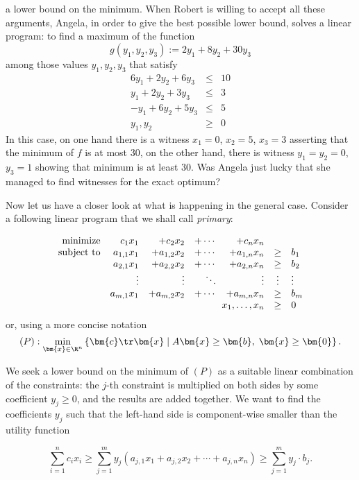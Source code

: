 a lower bound on the minimum. When Robert is willing to accept all these arguments, Angela, in order to give
the best possible lower bound, solves a linear program: to find a maximum of the function 
$$g(y_1,y_2,y_3):=2 y_1+8 y_2+30 y_3$$
among those values  $y_1, y_2, y_3$ that satisfy
\begin{eqnarray*}
6y_1 + 2y_2 + 6y_3 &\le& 10\\
y_1 + 2y_2 + 3y_3 &\le& 3\\
-y_1 + 6y_2 + 5y_3 &\le& 5\\
y_1,y_2 &\ge& 0
\end{eqnarray*}
In this case, on one hand there is a witness $x_1=0$, $x_2=5$, $x_3=3$ asserting that the minimum of $f$ is at 
most 30, on the other hand, there is witness  $y_1=y_2=0$, $y_3=1$ showing that minimum is at least 30.
Was Angela just lucky that she managed to find witnesses for the exact optimum?

\noindent
Now let us have a closer look at what is happening in the general case. Consider a following linear program that we 
shall call {\em primary}:

$$
\begin{array}{rrrrrcl}
  {\rm minimize}     & c_1x_1     & + c_2x_2       & + \cdots  & +c_nx_n  \\
  {\rm subject\ to} & a_{1,1}x_1 & + a_{1,2}x_2   & + \cdots  & +a_{1,n}x_n  & \ge & b_1 \\
                          & a_{2,1}x_1 & + a_{2,2}x_2   & + \cdots  & +a_{2,n}x_n  & \ge & b_2 \\
                          &   \vdots   &   \vdots       &   \ddots   &  \vdots      &  \vdots & \vdots\\ 
                          & a_{m,1}x_1 & + a_{m,2}x_2   & + \cdots  & +a_{m,n}x_n  & \ge & b_m \\
                          &\multicolumn{4}{r}{x_1,\ldots,x_n}&\ge&0
\end{array}
$$
or, using a more concise notation
$$ (P): \min_{\bm{x}\in\R^n}\left\{ \bm{c}\tr\bm{x} \mid A\bm{x}\ge\bm{b},\;\bm{x}\ge\bm{0}\right\}.$$

\noindent
We seek a  lower bound on the minimum of $(P)$ as a suitable linear combination of the constraints:
the $j$-th constraint is multiplied on both sides by some coefficient $y_j\ge0$, and the results are 
added together. We want to find the coefficients $y_j$ such that the left-hand side is component-wise
smaller than
the utility function

$$ \sum\limits_{i=1}^nc_ix_i\ge \sum\limits_{j=1}^m y_j 
\left(a_{j,1}x_1 + a_{j,2}x_2 + \cdots + a_{j,n}x_n\right) \ge  \sum\limits_{j=1}^my_j\cdot b_j. $$

